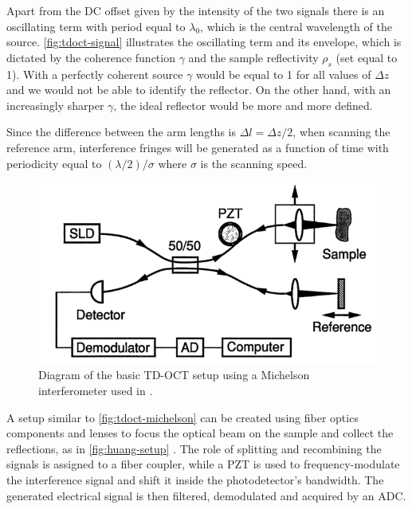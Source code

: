 Apart from the DC offset given by the intensity of the two signals there is an oscillating term with period equal to $\lambda_0$, which is the central wavelength of the source. \autoref{fig:tdoct-signal} illustrates the oscillating term and its envelope, which is dictated by the coherence function $\gamma$ and the sample reflectivity $\rho_s$ (set equal to 1). With a perfectly coherent source $\gamma$ would be equal to 1 for all values of $\Delta z $ and we would not be able to identify the reflector. On the other hand, with an increasingly sharper $\gamma$, the ideal reflector would be more and more defined. 


Since the difference between the arm lengths is $\Delta l = \Delta z / 2$, when scanning the reference arm, interference fringes will be generated as a function of time with periodicity equal to $(\lambda/2) / \sigma$ where $\sigma$ is the scanning speed. 

 
\begin{figure}[hbt]
	\myfloatalign
	\includegraphics[width=0.8\linewidth]{gfx/ch2/huang-setup}
	\caption{Diagram of the basic \ac{TD-OCT} setup using a Michelson interferometer used in \cite{Huang1991}.}\label{fig:huang-setup}
\end{figure}

A setup similar to \autoref{fig:tdoct-michelson} can be created using fiber optics components and lenses to focus the optical beam on the sample and collect the reflections, as in \autoref{fig:huang-setup} \cite{Huang1991}. The role of splitting and recombining the signals is assigned to a fiber coupler, while a \ac{PZT} is used to frequency-modulate the interference signal and shift it inside the photodetector's bandwidth. The generated electrical signal is then filtered, demodulated and acquired by an \ac{ADC}.



